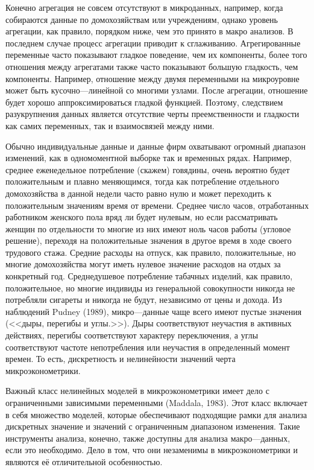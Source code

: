 	
	Конечно агрегация не совсем отсутствуют в микроданных, например, когда собираются данные по домохозяйствам или учреждениям, однако уровень агрегации, как правило, порядком ниже, чем это принято в макро анализов. В последнем случае процесс агрегации приводит к сглаживанию. Агрегированные переменные часто показывают гладкое поведение, чем их компоненты, более того отношения между агрегатами также часто показывают большую гладкость, чем компоненты. Например, отношение между двумя переменными на микроуровне может быть кусочно---линейной со многими узлами. После агрегации, отношение будет хорошо аппроксимироваться гладкой функцией. Поэтому, следствием разукрупнения данных является отсутствие черты преемственности и гладкости как самих переменных, так и взаимосвязей между ними.
	
	
	Обычно индивидуальные данные и данные фирм охватывают огромный диапазон изменений, как в одномоментной выборке так и временных рядах. Например, среднее еженедельное потребление (скажем) говядины, очень вероятно будет положительным и плавно меняющимся, тогда как потребление отдельного домохозяйства в данной недели часто равно нулю и может переходить к положительным значениям время от времени. Среднее число часов, отработанных работником женского пола вряд ли будет нулевым, но если рассматривать женщин по отдельности то многие из них имеют ноль часов работы (угловое решение), переходя на положительные значения в другое время в ходе своего трудового стажа. Средние расходы на отпуск, как правило, положительные, но многие домохозяйства могут иметь нулевое значение расходов на отдых за конкретный год. Среднедушевое потребление табачных изделий, как правило, положительное, но многие индивиды из генеральной совокупности никогда не потребляли сигареты и никогда не будут, независимо от цены и дохода. Из наблюдений Pudney (1989), микро---данные чаще всего имеют пустые значения (<<дыры, перегибы и углы.>>). Дыры соответствуют неучастия в активных действиях, перегибы соответствуют характеру переключения, а углы соответствуют частоте непотребления или неучастия в определенный момент времен. То есть, дискретность и нелинейности значений черта микроэконометрики.
	
	
	Важный класс нелинейных моделей в микроэконометрики имеет дело с ограниченными зависимыми переменными (Maddala, 1983). Этот класс включает в себя множество моделей, которые обеспечивают подходящие рамки для анализа дискретных значение и значений с ограниченным диапазоном изменения. Такие инструменты анализа, конечно, также доступны для анализа макро---данных, если это необходимо. Дело в том, что они незаменимы в микроэконометрики и являются её отличительной особенностью.


